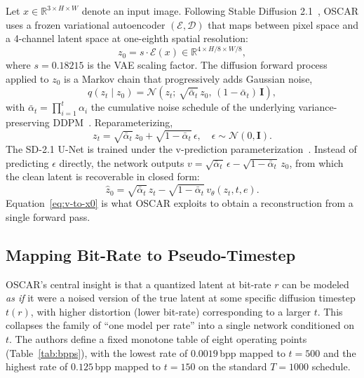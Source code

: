 \documentclass[conference]{IEEEtran}
\begin{document}
Let $x \in \mathbb{R}^{3 \times H \times W}$ denote an input image. Following
Stable Diffusion 2.1~\cite{ldm}, OSCAR uses a frozen variational autoencoder
$(\mathcal{E}, \mathcal{D})$ that maps between pixel space and a 4-channel latent
space at one-eighth spatial resolution:
\begin{equation}
z_0 = s \cdot \mathcal{E}(x) \in \mathbb{R}^{4 \times H/8 \times W/8},
\label{eq:vae-encode}
\end{equation}
where $s = 0.18215$ is the VAE scaling factor. The diffusion forward process
applied to $z_0$ is a Markov chain that progressively adds Gaussian noise,
\begin{equation}
q(z_t \mid z_0) = \mathcal{N}\!\left(z_t;\, \sqrt{\bar{\alpha}_t}\, z_0,\, (1-\bar{\alpha}_t)\, \mathbf{I}\right),
\label{eq:forward}
\end{equation}
with $\bar{\alpha}_t = \prod_{i=1}^{t}\alpha_i$ the cumulative noise schedule of
the underlying variance-preserving DDPM~\cite{ddpm}. Reparameterizing,
\begin{equation}
z_t = \sqrt{\bar{\alpha}_t}\, z_0 + \sqrt{1-\bar{\alpha}_t}\, \epsilon, \quad \epsilon \sim \mathcal{N}(0, \mathbf{I}).
\label{eq:forward-repar}
\end{equation}
The SD-2.1 U-Net is trained under the v-prediction parameterization~\cite{vpred}.
Instead of predicting $\epsilon$ directly, the network outputs
$v = \sqrt{\bar{\alpha}_t}\,\epsilon - \sqrt{1-\bar{\alpha}_t}\, z_0$, from which
the clean latent is recoverable in closed form:
\begin{equation}
\hat{z}_0 = \sqrt{\bar{\alpha}_t}\, z_t - \sqrt{1-\bar{\alpha}_t}\, v_\theta(z_t, t, e).
\label{eq:v-to-x0}
\end{equation}
Equation~\eqref{eq:v-to-x0} is what OSCAR exploits to obtain a reconstruction
from a single forward pass.

\subsection{Mapping Bit-Rate to Pseudo-Timestep}

OSCAR's central insight is that a quantized latent at bit-rate $r$ can be
modeled \emph{as if} it were a noised version of the true latent at some
specific diffusion timestep $t(r)$, with higher distortion (lower bit-rate)
corresponding to a larger $t$. This collapses the family of ``one model per
rate'' into a single network conditioned on $t$. The authors define a fixed
monotone table of eight operating points (Table~\ref{tab:bpps}), with the
lowest rate of $0.0019$\,bpp mapped to $t = 500$ and the highest rate of
$0.125$\,bpp mapped to $t = 150$ on the standard $T = 1000$ schedule.
\end{document}

